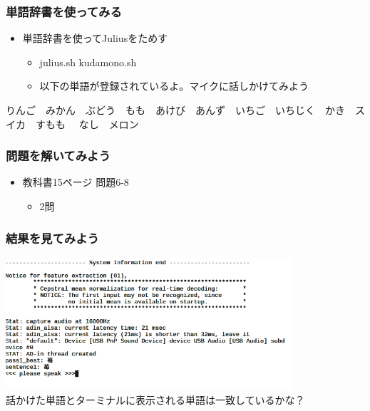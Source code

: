 \documentclass[14pt]{beamer}
\begin{document}
\begin{frame}
  \frametitle{単語辞書を使ってみる}
  \begin{itemize}
    \item 単語辞書を使ってJuliusをためす
    \begin{itemize}
      \item julius.sh kudamono.sh
      \item 以下の単語が登録されているよ。マイクに話しかけてみよう
    \end{itemize}
  \end{itemize}
  \begin{center}
    {\small りんご　みかん　ぶどう　もも　あけび　あんず　いちご　いちじく　かき　スイカ　すもも　	なし　メロン}
  \end{center}
\end{frame}

\begin{frame}
  \frametitle{問題を解いてみよう}
  \begin{itemize}
    \item 教科書15ページ 問題6-8
    \begin{itemize}
      \item 2問
    \end{itemize}
  \end{itemize}
\end{frame}

\begin{frame}
\frametitle{結果を見てみよう} 
  \centering
  \includegraphics[width=0.8\textwidth]{julius_demo_strawberry.png} \\
  話かけた単語とターミナルに表示される単語は一致しているかな？
\end{frame}
\end{document}
